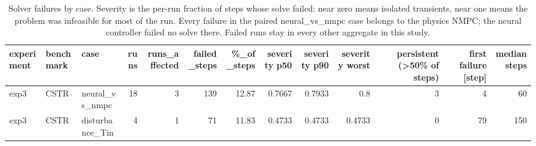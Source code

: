 \begin{table}
\caption{Solver failures by case. Severity is the per-run fraction of steps whose solve failed: near zero means isolated transients, near one means the problem was infeasible for most of the run. Every failure in the paired neural\_vs\_nmpc case belongs to the physics NMPC; the neural controller failed no solve there. Failed runs stay in every other aggregate in this study.}
\label{tab:T6_solver_failures}
\begin{tabular}{lllrrrrrrrrrr}
\toprule
experiment & benchmark & case & runs & runs\_affected & failed\_steps & \%\_of\_steps & severity p50 & severity p90 & severity worst & persistent (>50\% of steps) & first failure [step] & median steps \\
\midrule
exp3 & CSTR & neural\_vs\_nmpc & 18 & 3 & 139 & 12.87 & 0.7667 & 0.7933 & 0.8 & 3 & 4 & 60 \\
exp3 & CSTR & disturbance\_Tin & 4 & 1 & 71 & 11.83 & 0.4733 & 0.4733 & 0.4733 & 0 & 79 & 150 \\
\bottomrule
\end{tabular}
\end{table}
